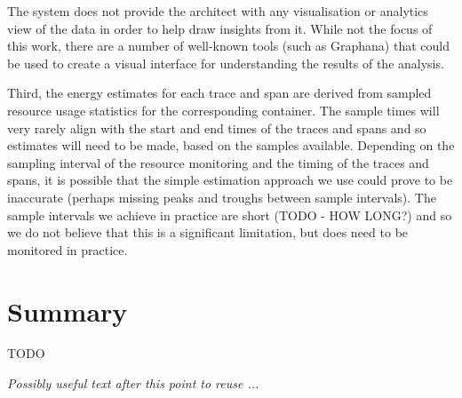 The system does not provide the architect with any visualisation or analytics view of the data in order to help draw insights from it.  While not the focus of this work, there are a number of well-known tools (such as Graphana) that could be used to create a visual interface for understanding the results of the analysis.

Third, the energy estimates for each trace and span are derived from sampled resource usage statistics for the corresponding container.  The sample times will very rarely align with the start and end times of the traces and spans and so estimates will need to be made, based on the samples available.  Depending on the sampling interval of the resource monitoring and the timing of the traces and spans, it is possible that the simple estimation approach we use could prove to be inaccurate (perhaps missing peaks and troughs between sample intervals).  The sample intervals we achieve in practice are short (TODO - HOW LONG?) and so we do not believe that this is a significant limitation, but does need to be monitored in practice.

\section{Summary}

TODO

\textit{Possibly useful text after this point to reuse ...}


